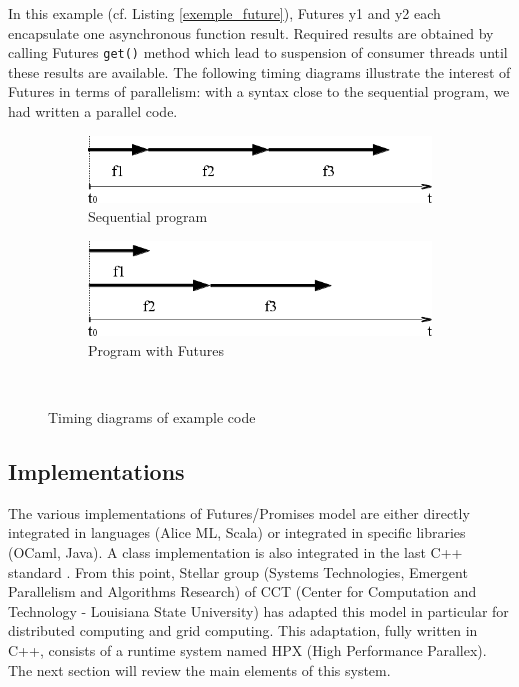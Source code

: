\documentclass{llncs}
\begin{document}
In this example (cf. Listing \ref{exemple_future}), Futures y1 and y2 each encapsulate one asynchronous function result. Required results are obtained by calling Futures \texttt{get()} method which lead to suspension of consumer threads until these results are available. The following timing diagrams illustrate the interest of Futures in terms of parallelism: with a syntax close to the sequential program, we had written a parallel code.

\begin{figure}[h]
      \begin{subfigure}[b]{0.5\textwidth}
	      \centering
	      \includegraphics[scale=0.4]{Images/Im2.png}
	      \caption{Sequential program}
	      
      \end{subfigure}
      \begin{subfigure}[b]{0.5\textwidth}
	      \centering
	      \includegraphics[scale=0.4]{Images/Im3.png}
	      \caption{Program with Futures}
      \end{subfigure}\\
      
      \caption{Timing diagrams of example code}
      \label{chronofuture}
\end{figure}

\subsection{Implementations}
The various implementations of Futures/Promises model are either directly integrated in languages (Alice ML, Scala) or integrated in specific libraries (OCaml, Java). A class implementation is also integrated in the last C++ standard \cite{Futuresc++}. From this point, Stellar group (Systems Technologies, Emergent Parallelism and Algorithms Research) of CCT (Center for Computation and Technology - Louisiana State University) has adapted this model in particular for distributed computing and grid computing. This adaptation, fully written in C++, consists of a runtime system named HPX (High Performance Parallex). The next section will review the main elements of this system.   
\end{document}
